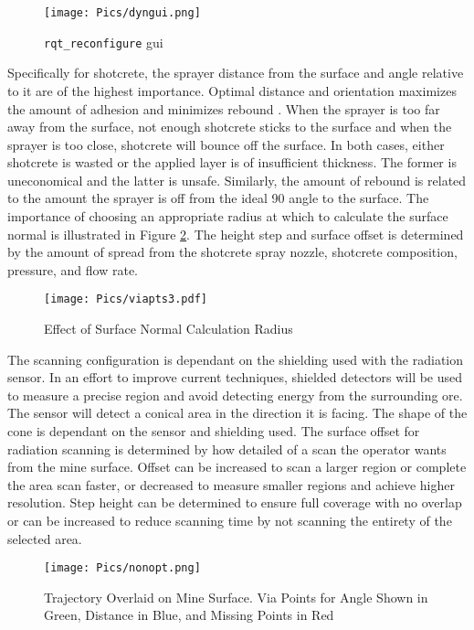 \begin{figure}[h]
    \centering
    \texttt{[image: Pics/dyngui.png]}
    \caption{\texttt{rqt\_reconfigure} \acrshort{gui}}
    \label{fig:dyngui}
\end{figure}

Specifically for shotcrete, the sprayer distance from the surface and angle relative to it are of the highest importance. Optimal distance and orientation maximizes the amount of adhesion and minimizes rebound  \cite{spraypat}. When the sprayer is too far away from the surface, not enough shotcrete sticks to the surface and when the sprayer is too close, shotcrete will bounce off the surface. In both cases, either shotcrete is wasted or the applied layer is of insufficient thickness. The former is uneconomical and the latter is unsafe. Similarly, the amount of rebound is related to the amount the sprayer is off from the ideal 90\degree\hspace{0pt} angle to the surface. The importance of choosing an appropriate radius at which to calculate the surface normal is illustrated in Figure \ref{fig:vianorm}. The height step and surface offset is determined by the amount of spread from the shotcrete spray nozzle, shotcrete composition, pressure, and flow rate.\\
\clearpage
\begin{figure}[h]
    \centering
    \texttt{[image: Pics/viapts3.pdf]}
    \caption{Effect of Surface Normal Calculation Radius}
    \label{fig:vianorm}
\end{figure}

The scanning configuration is dependant on the shielding used with the radiation sensor. In an effort to improve current techniques, shielded detectors will be used to measure a precise region and avoid detecting energy from the surrounding ore. The sensor will detect a conical area in the direction it is facing. The shape of the cone is dependant on the sensor and shielding used. The surface offset for radiation scanning is determined by how detailed of a scan the operator wants from the mine surface. Offset can be increased to scan a larger region or complete the area scan faster, or decreased to measure smaller regions and achieve higher resolution. Step height can be determined to ensure full coverage with no overlap or can be increased to reduce scanning time by not scanning the entirety of the selected area.\\
\begin{figure}[h]
    \centering
    \texttt{[image: Pics/nonopt.png]}
    \caption{Trajectory Overlaid on Mine Surface. Via Points for Angle Shown in Green, Distance in Blue, and Missing Points in Red}
    \label{fig:unidealspray}
\end{figure}

